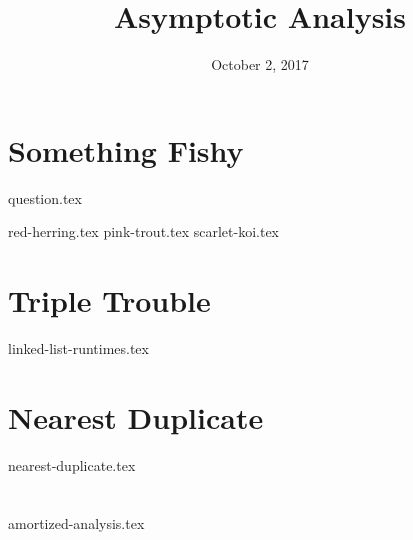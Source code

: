 \documentclass[11pt]{exam}
\title{Asymptotic Analysis}
\date{October 2, 2017}
\begin{document}
\maketitle

\section{Something Fishy}
{question.tex}
\begin{questions}
{red-herring.tex}
{pink-trout.tex}
{scarlet-koi.tex}
\end{questions}

\clearpage

\section{Triple Trouble}
\begin{questions}
{linked-list-runtimes.tex}
\end{questions}

\clearpage

\section{Nearest Duplicate}
\begin{questions}
{nearest-duplicate.tex}
\end{questions}

\clearpage

\section{}
\begin{questions}
{amortized-analysis.tex}
\end{questions}
\end{document}
